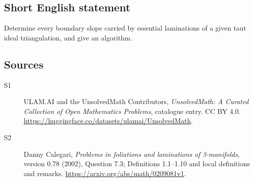 \documentclass[11pt]{article}
\begin{document}
\subsection{Short English statement}
Determine every boundary slope carried by essential laminations of a given taut ideal triangulation, and give an algorithm.
\subsection{Sources}
\begin{description}
\item[\hypertarget{source:statement:1}{S1}] ULAM.AI and the UnsolvedMath Contributors, \emph{UnsolvedMath: A Curated Collection of Open Mathematics Problems}, catalogue entry. CC BY 4.0. \url{https://huggingface.co/datasets/ulamai/UnsolvedMath}.
\item[\hypertarget{source:statement:2}{S2}] Danny Calegari, \emph{Problems in foliations and laminations of 3-manifolds}, version 0.78 (2002), Question 7.3; Definitions 1.1--1.10 and local definitions and remarks. \url{https://arxiv.org/abs/math/0209081v1}.
\end{description}
\label{end:statement}
\end{document}
